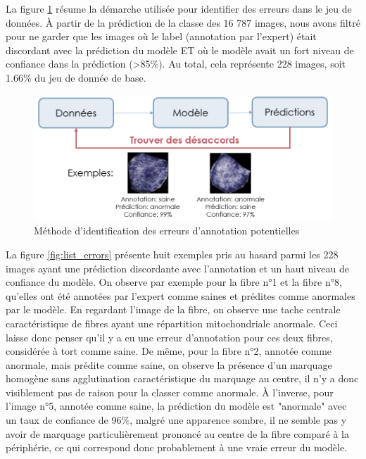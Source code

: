 La figure \ref{fig:identify_errors} résume la démarche utilisée pour identifier des erreurs dans le jeu de données. À partir de la prédiction de la classe des 16 787 images, nous avons filtré pour ne garder que les images où le label (annotation par l'expert) était discordant avec la prédiction du modèle ET où le modèle avait un fort niveau de confiance dans la prédiction (>85\%). Au total, cela représente 228 images, soit 1.66\% du jeu de donnée de base.
\begin{figure}[!ht]
 \centering
 \includegraphics[width=1\textwidth]{figures/identify_errors.png}
 \caption[Méthode d'identification des potentielles erreurs d'annotation]{Méthode d'identification des erreurs d'annotation potentielles }
 \label{fig:identify_errors}
\end{figure}

La figure \ref{fig:list_errors} présente huit exemples pris au hasard parmi les 228 images ayant une prédiction discordante avec l'annotation et un haut niveau de confiance du modèle. On observe par exemple pour la fibre n°1 et la fibre n°8, qu'elles ont été annotées par l'expert comme saines et prédites comme anormales par le modèle. En regardant l'image de la fibre, on observe une tache centrale caractéristique de fibres ayant une répartition mitochondriale anormale. Ceci laisse donc penser qu'il y a eu une erreur d'annotation pour ces deux fibres, considérée à tort comme saine. De même, pour la fibre n°2, annotée comme anormale, mais prédite comme saine, on observe la présence d'un marquage homogène sans agglutination caractéristique du marquage au centre, il n'y a donc visiblement pas de raison pour la classer comme anormale. À l'inverse, pour l'image n°5, annotée comme saine, la prédiction du modèle est "anormale" avec un taux de confiance de 96\%, malgré une apparence sombre,  il ne semble pas y avoir de marquage particulièrement prononcé au centre de la fibre comparé à la périphérie, ce qui correspond donc probablement à une vraie erreur du modèle.

